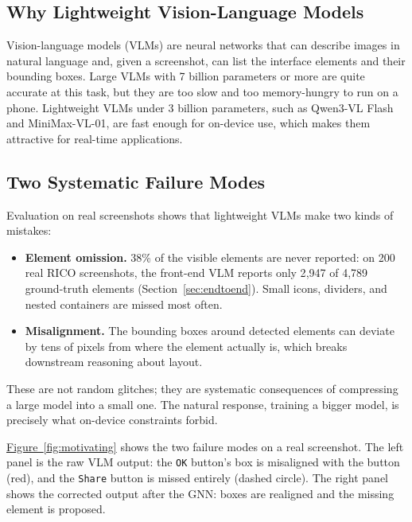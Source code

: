\documentclass[11pt, letterpaper]{article}
\begin{document}
\subsection{Why Lightweight Vision-Language Models}
Vision-language models (VLMs) are neural networks that can describe images in
natural language and, given a screenshot, can list the interface elements and
their bounding boxes. Large VLMs with 7 billion parameters or more are quite
accurate at this task, but they are too slow and too memory-hungry to run on a
phone. Lightweight VLMs under 3 billion parameters, such as Qwen3-VL Flash
\cite{bai2023qwen} and MiniMax-VL-01, are fast enough for on-device use, which
makes them attractive for real-time applications.

\subsection{Two Systematic Failure Modes}
Evaluation on real screenshots shows that lightweight VLMs make two
kinds of mistakes:

\begin{itemize}
\item \textbf{Element omission.} 38\% of the visible elements are never
reported: on 200 real RICO screenshots, the front-end VLM reports only 2{,}947
of 4{,}789 ground-truth elements (Section~\ref{sec:endtoend}). Small icons,
dividers, and nested containers are missed most often.
\item \textbf{Misalignment.} The bounding boxes around detected elements can
deviate by tens of pixels from where the element actually is, which breaks
downstream reasoning about layout.
\end{itemize}

These are not random glitches; they are systematic consequences of
compressing a large model into a small one. The natural response, training a
bigger model, is precisely what on-device constraints forbid.

\hyperref[fig:motivating]{Figure~\ref{fig:motivating}} shows the two failure modes on a real screenshot.
The left panel is the raw VLM output: the \texttt{OK} button's box is
misaligned with the button (red), and the \texttt{Share} button is missed
entirely (dashed circle). The right panel shows the corrected output after
the GNN: boxes are realigned and the missing element is proposed.
\end{document}
